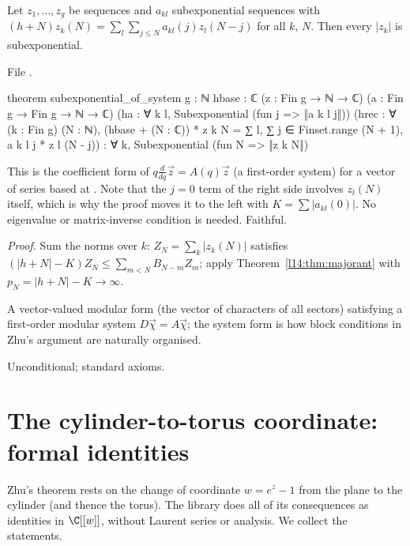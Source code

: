 \begin{theorem}\label{l14:thm:system}
Let $z_1,\dots,z_g$ be sequences and $a_{kl}$ subexponential sequences with
$(h+N)z_k(N) = \sum_l\sum_{j\le N}a_{kl}(j)z_l(N-j)$ for all $k$, $N$. Then every $|z_k|$ is subexponential.
\end{theorem}
\noindent File .
\begin{leancode}
theorem subexponential_of_system {g : ℕ} {hbase : ℂ}
    (z : Fin g → ℕ → ℂ) (a : Fin g → Fin g → ℕ → ℂ)
    (ha : ∀ k l, Subexponential (fun j => ‖a k l j‖))
    (hrec : ∀ (k : Fin g) (N : ℕ),
      (hbase + (N : ℂ)) * z k N
        = ∑ l, ∑ j ∈ Finset.range (N + 1), a k l j * z l (N - j)) :
    ∀ k, Subexponential (fun N => ‖z k N‖)
\end{leancode}
\begin{dictionary}
This is the coefficient form of $q\frac{d}{dq}\vec z = A(q)\vec z$ (a first-order system) for a vector of series based at
. Note that the $j=0$ term of the right side involves $z_l(N)$ itself, which is why the proof moves it to the left
with $K = \sum|a_{kl}(0)|$. No eigenvalue or matrix-inverse condition is needed. Faithful.
\end{dictionary}
\noindent\emph{Proof.} Sum the norms over $k$: $Z_N = \sum_k|z_k(N)|$ satisfies $(|h+N| - K)Z_N\le\sum_{m<N}B_{N-m}Z_m$; apply
Theorem~\ref{l14:thm:majorant} with $p_N = |h+N| - K\to\infty$.
\begin{physics}
A vector-valued modular form (the vector of characters of all sectors) satisfying a first-order modular system
$D\vec\chi = A\vec\chi$; the system form is how block conditions in Zhu's argument are naturally organised.
\end{physics}
\begin{status}
Unconditional; standard axioms.
\end{status}

\section{The cylinder-to-torus coordinate: formal identities}\label{l14:sec:coord}

Zhu's theorem rests on the change of coordinate $w = e^z - 1$ from the plane to the cylinder (and thence the torus). The library
does all of its consequences as identities in $\C[[w]]$, without Laurent series or analysis. We collect the statements.

